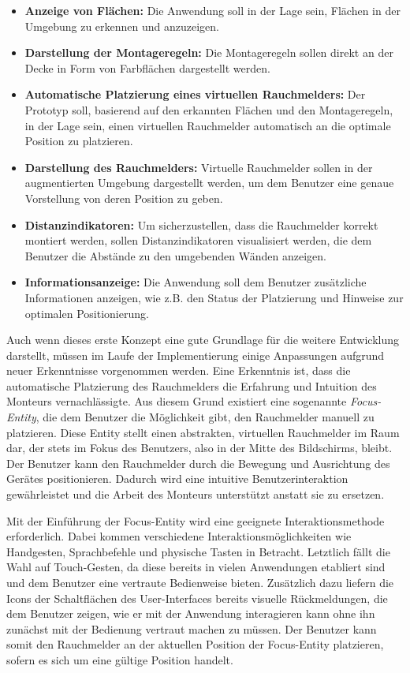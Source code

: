 \begin{itemize}
    \item \textbf{Anzeige von Flächen:} Die Anwendung soll in der Lage sein, Flächen in der Umgebung zu erkennen und anzuzeigen.
    \item \textbf{Darstellung der Montageregeln:} Die Montageregeln sollen direkt an der Decke in Form von Farbflächen dargestellt werden.
    \item \textbf{Automatische Platzierung eines virtuellen Rauchmelders:} Der Prototyp soll, basierend auf den erkannten Flächen und den Montageregeln, in der Lage sein, einen virtuellen Rauchmelder automatisch an die optimale Position zu platzieren.
    \item \textbf{Darstellung des Rauchmelders:} Virtuelle Rauchmelder sollen in der augmentierten Umgebung dargestellt werden, um dem Benutzer eine genaue Vorstellung von deren Position zu geben.
    \item \textbf{Distanzindikatoren:} Um sicherzustellen, dass die Rauchmelder korrekt montiert werden, sollen Distanzindikatoren visualisiert werden, die dem Benutzer die Abstände zu den umgebenden Wänden anzeigen.
    \item \textbf{Informationsanzeige:} Die Anwendung soll dem Benutzer zusätzliche Informationen anzeigen, wie z.B. den Status der Platzierung und Hinweise zur optimalen Positionierung.
\end{itemize}

Auch wenn dieses erste Konzept eine gute Grundlage für die weitere Entwicklung darstellt, müssen im Laufe der Implementierung einige Anpassungen aufgrund neuer Erkenntnisse vorgenommen werden. Eine Erkenntnis ist, dass die automatische Platzierung des Rauchmelders die Erfahrung und Intuition des Monteurs vernachlässigte. Aus diesem Grund existiert eine sogenannte \emph{Focus-Entity}, die dem Benutzer die Möglichkeit gibt, den Rauchmelder manuell zu platzieren. Diese Entity stellt einen abstrakten, virtuellen Rauchmelder im Raum dar, der stets im Fokus des Benutzers, also in der Mitte des Bildschirms, bleibt. Der Benutzer kann den Rauchmelder durch die Bewegung und Ausrichtung des Gerätes positionieren. Dadurch wird eine intuitive Benutzerinteraktion gewährleistet und die Arbeit des Monteurs unterstützt anstatt sie zu ersetzen.

Mit der Einführung der Focus-Entity wird eine geeignete Interaktionsmethode erforderlich. Dabei kommen verschiedene Interaktionsmöglichkeiten wie Handgesten, Sprachbefehle und physische Tasten in Betracht. Letztlich fällt die Wahl auf Touch-Gesten, da diese bereits in vielen Anwendungen etabliert sind und dem Benutzer eine vertraute Bedienweise bieten. Zusätzlich dazu liefern die Icons der Schaltflächen des User-Interfaces bereits visuelle Rückmeldungen, die dem Benutzer zeigen, wie er mit der Anwendung interagieren kann ohne ihn zunächst mit der Bedienung vertraut machen zu müssen. Der Benutzer kann somit den Rauchmelder an der aktuellen Position der Focus-Entity platzieren, sofern es sich um eine gültige Position handelt.

